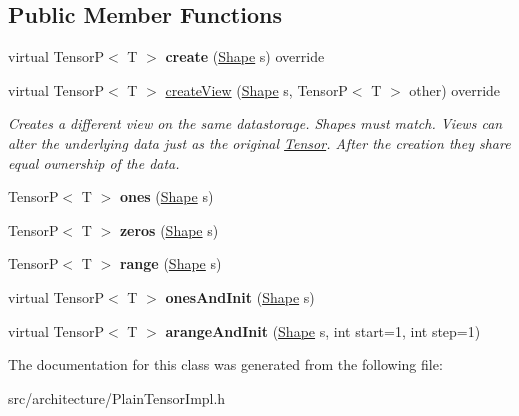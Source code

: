 \subsection*{Public Member Functions}
\begin{DoxyCompactItemize}
\item 
\mbox{\label{classPlainTensorFactory_af46037c3e4e9ae9579247250fa003737}} 
virtual TensorP$<$ T $>$ {\bfseries create} (\hyperlink{classShape}{Shape} s) override
\item 
\mbox{\label{classPlainTensorFactory_a221f21b72137ad3460a2914a77f9b98f}} 
virtual TensorP$<$ T $>$ \hyperlink{classPlainTensorFactory_a221f21b72137ad3460a2914a77f9b98f}{create\+View} (\hyperlink{classShape}{Shape} s, TensorP$<$ T $>$ other) override
\begin{DoxyCompactList}\small\item\em Creates a different view on the same datastorage. Shapes must match. Views can alter the underlying data just as the original \hyperlink{classTensor}{Tensor}. After the creation they share equal ownership of the data. \end{DoxyCompactList}\item 
\mbox{\label{classPlainTensorFactory_a1d2ad4cff7795b8aca08e0cce6a25460}} 
TensorP$<$ T $>$ {\bfseries ones} (\hyperlink{classShape}{Shape} s)
\item 
\mbox{\label{classPlainTensorFactory_a7aa6fd3ac0fc2f2d8a190265ce799e8c}} 
TensorP$<$ T $>$ {\bfseries zeros} (\hyperlink{classShape}{Shape} s)
\item 
\mbox{\label{classPlainTensorFactory_a5b7fcd7f1430f6db2942e34d16506ac6}} 
TensorP$<$ T $>$ {\bfseries range} (\hyperlink{classShape}{Shape} s)
\item 
\mbox{\label{classPlainTensorFactory_a5dd2321bee11f00b9874562a5ce65fc0}} 
virtual TensorP$<$ T $>$ {\bfseries ones\+And\+Init} (\hyperlink{classShape}{Shape} s)
\item 
\mbox{\label{classPlainTensorFactory_af2fc84f75b3c3f03a056964095c829fe}} 
virtual TensorP$<$ T $>$ {\bfseries arange\+And\+Init} (\hyperlink{classShape}{Shape} s, int start=1, int step=1)
\end{DoxyCompactItemize}


The documentation for this class was generated from the following file\+:\begin{DoxyCompactItemize}
\item 
src/architecture/Plain\+Tensor\+Impl.\+h\end{DoxyCompactItemize}
